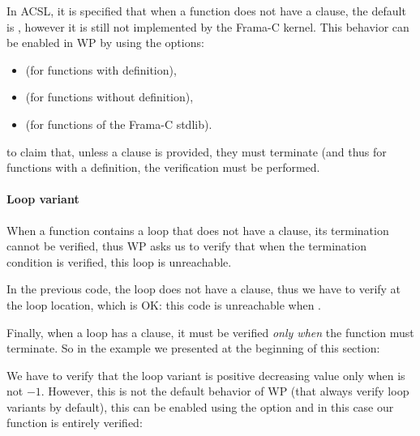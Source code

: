 \begin{Information}
  In ACSL, it is specified that when a function does not have a
   clause, the default is
  , however it is still not
  implemented by the Frama-C kernel. This behavior can be enabled in WP
  by using the options:
  \begin{itemize}
  \item {} (for functions with definition),
  \item {} (for functions without definition),
  \item {} (for functions of the Frama-C stdlib).
  \end{itemize}
  to claim that, unless a clause is provided, they must terminate (and thus
  for functions with a definition, the verification must be performed.
\end{Information}


\paragraph{Loop variant}



When a function contains a loop that does not have a 
clause, its termination cannot be verified, thus WP asks us to verify that when
the termination condition is verified, this loop is unreachable.






In the previous code, the loop does not have a 
clause, thus we have to verify 
at the loop location, which is OK: this code is unreachable when
.



Finally, when a loop has a  clause, it must be
verified {\em only when} the function must terminate. So in the example
we presented at the beginning of this section:






We have to verify that the loop variant is positive decreasing value only
when  is not $-1$. However, this is not the default
behavior of WP (that always verify loop variants by default), this can
be enabled using the option  and
in this case our function is entirely verified:



